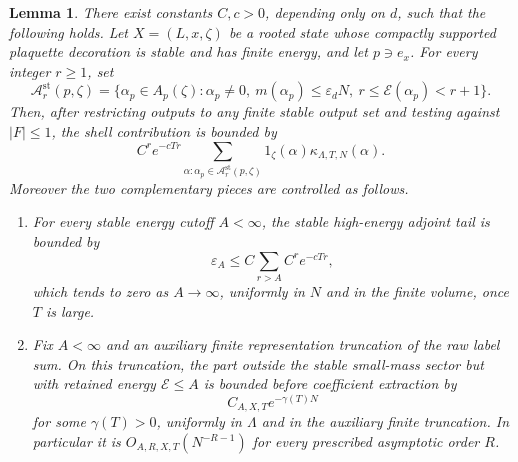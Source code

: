 \documentclass[11pt,a4paper,reqno]{amsart}
\newtheorem{lemma}[theorem]{Lemma}
\theoremstyle{definition}
\theoremstyle{remark}
\begin{document}
\begin{lemma}\label{lem:paid-shell-row}
There exist constants $C,c>0$, depending only on $d$, such that the following holds.  Let $X=(L,x,\zeta)$ be a rooted state whose compactly supported plaquette decoration is stable and has finite energy, and let $p\ni e_x$.  For every integer $r\ge1$, set
\[
\mathcal A^{\mathrm{st}}_r(p,\zeta)
=\{\alpha_p\in A_p(\zeta):\alpha_p\ne0,
\ m(\alpha_p)\le\varepsilon_dN,
\ r\le \mathcal E(\alpha_p)<r+1\}.
\]
Then, after restricting outputs to any finite stable output set and testing against $|F|\le1$, the shell contribution is bounded by
\[
C^r e^{-cTr}\sum_{\alpha:\alpha_p\in\mathcal A^{\mathrm{st}}_r(p,\zeta)}1_\zeta(\alpha)\kappa_{\Lambda,T,N}(\alpha).
\]
Moreover the two complementary pieces are controlled as follows.
\begin{enumerate}
\item For every stable energy cutoff $A<\infty$, the stable high-energy adjoint tail is bounded by
\begin{equation}\label{eq:stable-energy-tail-paid-row}
\varepsilon_A
\le
C\sum_{r>A} C^r e^{-cTr},
\end{equation}
which tends to zero as $A\to\infty$, uniformly in $N$ and in the finite volume, once $T$ is large.
\item Fix $A<\infty$ and an auxiliary finite representation truncation of the raw label sum.  On this truncation, the part outside the stable small-mass sector but with retained energy $\mathcal E\le A$ is bounded before coefficient extraction by
\begin{equation}\label{eq:paid-unstable-complement}
C_{A,X,T}e^{-\gamma(T)N}
\end{equation}
for some $\gamma(T)>0$, uniformly in $\Lambda$ and in the auxiliary finite truncation.  In particular it is $O_{A,R,X,T}(N^{-R-1})$ for every prescribed asymptotic order $R$.
\end{enumerate}
\end{lemma}
\end{document}
